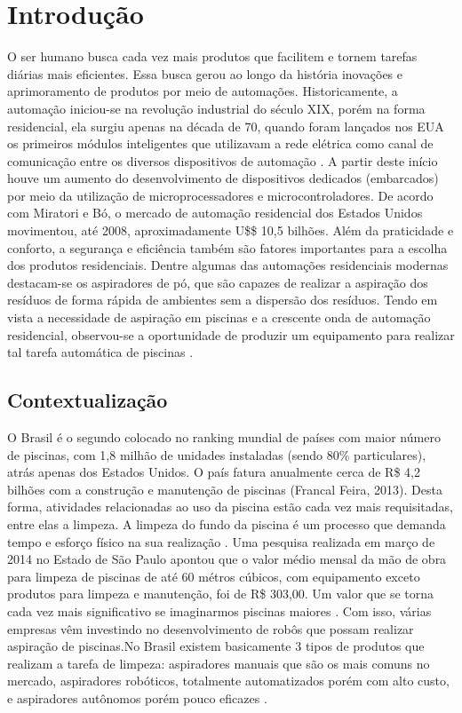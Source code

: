 \chapter{Introdução}
O ser humano busca cada vez mais produtos que facilitem e tornem tarefas 
diárias mais eficientes. Essa busca gerou ao longo da história inovações e 
aprimoramento de produtos por meio de automações. Historicamente, a automação 
iniciou-se na revolução industrial do século XIX, porém na forma residencial, 
ela surgiu apenas na década de 70, quando foram lançados nos EUA os primeiros 
módulos inteligentes que utilizavam a rede elétrica como canal de comunicação 
entre os diversos dispositivos de automação \cite{sra}. A partir deste início 
houve um aumento do desenvolvimento de dispositivos dedicados (embarcados) por 
meio da utilização de microprocessadores e microcontroladores. De acordo com 
Miratori e Bó, o mercado de automação residencial dos Estados Unidos 
movimentou, até 2008, aproximadamente U\$\$ 10,5 bilhões. Além da praticidade 
e conforto, a segurança e eficiência também são fatores importantes para a 
escolha dos produtos residenciais. Dentre algumas das automações residenciais 
modernas destacam-se os aspiradores de pó, que são capazes de realizar a 
aspiração dos resíduos de forma rápida de ambientes sem a dispersão dos 
resíduos. Tendo em vista a necessidade de aspiração em piscinas e a crescente 
onda de automação residencial, observou-se a oportunidade de produzir um 
equipamento para realizar tal tarefa automática de piscinas \cite{kanno2014}.

\section{Contextualização}
O Brasil é o segundo colocado no ranking mundial de países com maior número de 
piscinas, com 1,8 milhão de unidades instaladas (sendo 80\% particulares), 
atrás apenas dos Estados Unidos. O país fatura anualmente cerca de R\$ 4,2 
bilhões com a construção e manutenção de piscinas (Francal Feira, 2013). Desta 
forma, atividades relacionadas ao uso da piscina estão cada vez mais 
requisitadas, entre elas a limpeza. A limpeza do fundo da piscina é um processo
que demanda tempo e esforço físico na sua realização . Uma pesquisa realizada 
em  março de 2014 no Estado de São Paulo apontou que o valor médio mensal da 
mão de obra para limpeza de piscinas de até 60 métros cúbicos, com equipamento exceto 
produtos para limpeza e manutenção,  foi de R\$ 303,00. Um valor que se torna 
cada vez mais significativo se imaginarmos piscinas maiores \cite{datafolha2014}. 
Com isso, várias empresas vêm investindo no desenvolvimento de robôs que possam
realizar aspiração de piscinas.No Brasil existem basicamente 3 tipos de 
produtos que realizam a tarefa de limpeza: aspiradores manuais que são os mais 
comuns no mercado, aspiradores robóticos, totalmente automatizados porém com 
alto custo, e aspiradores autônomos porém pouco eficazes \cite{miura2009}.

